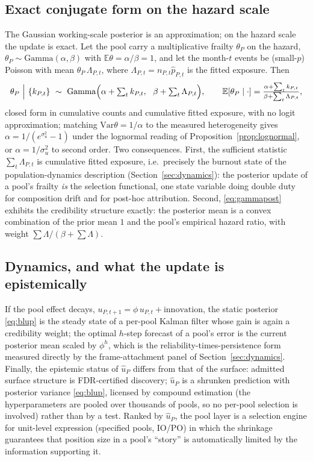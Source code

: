 \documentclass[11pt]{article}
\newcommand{\E}{\mathbb{E}}
\newcommand{\Var}{\mathrm{Var}}
\begin{document}
\subsection{Exact conjugate form on the hazard scale}
The Gaussian working-scale posterior is an approximation; on the hazard scale the
update is exact. Let the pool carry a multiplicative frailty $\theta_P$ on the hazard,
$\theta_P\sim\mathrm{Gamma}(\alpha,\beta)$ with $\E\theta=\alpha/\beta=1$, and let the
month-$t$ events be (small-$p$) Poisson with mean $\theta_P\,\Lambda_{P,t}$, where
$\Lambda_{P,t}=n_{P,t}\hat p_{P,t}$ is the fitted exposure. Then
\begin{equation}\label{eq:gammapost}
\theta_P\ \Big|\ \{k_{P,t}\}\ \sim\
\mathrm{Gamma}\Bigl(\alpha+\textstyle\sum_t k_{P,t},\ \ \beta+\sum_t\Lambda_{P,t}\Bigr),
\qquad
\E[\theta_P\mid\cdot]=\frac{\alpha+\sum_t k_{P,t}}{\beta+\sum_t\Lambda_{P,t}} ,
\end{equation}
closed form in cumulative counts and cumulative fitted exposure, with no logit
approximation; matching $\Var\theta=1/\alpha$ to the measured heterogeneity gives
$\alpha=1/(e^{\sigma_u^2}-1)$ under the lognormal reading of
Proposition~\ref{prop:lognormal}, or $\alpha=1/\sigma_u^2$ to second order. Two
consequences. First, the sufficient statistic $\sum_t\Lambda_{P,t}$ is cumulative
fitted exposure, i.e.\ precisely the burnout state of the population-dynamics
description (Section~\ref{sec:dynamics}): the posterior update of a pool's frailty
\emph{is} the selection functional, one state variable doing double duty for
composition drift and for post-hoc attribution. Second, \eqref{eq:gammapost} exhibits
the credibility structure exactly: the posterior mean is a convex combination of the
prior mean $1$ and the pool's empirical hazard ratio, with weight
$\sum\Lambda/(\beta+\sum\Lambda)$.

\subsection{Dynamics, and what the update is epistemically}
If the pool effect decays, $u_{P,t+1}=\phi\,u_{P,t}+\text{innovation}$, the static
posterior \eqref{eq:blup} is the steady state of a per-pool Kalman filter whose gain is
again a credibility weight; the optimal $h$-step forecast of a pool's error is the
current posterior mean scaled by $\phi^h$, which is the reliability-times-persistence
form measured directly by the frame-attachment panel of Section~\ref{sec:dynamics}.
Finally, the epistemic status of $\hat u_P$ differs from that of the surface: admitted
surface structure is FDR-certified discovery; $\hat u_P$ is a shrunken prediction with
posterior variance \eqref{eq:blup}, licensed by compound estimation (the
hyperparameters are pooled over thousands of pools, so no per-pool selection is
involved) rather than by a test. Ranked by $\hat u_P$, the pool layer is a selection
engine for unit-level expression (specified pools, IO/PO) in which the shrinkage
guarantees that position size in a pool's ``story'' is automatically limited by the
information supporting it.
\end{document}
